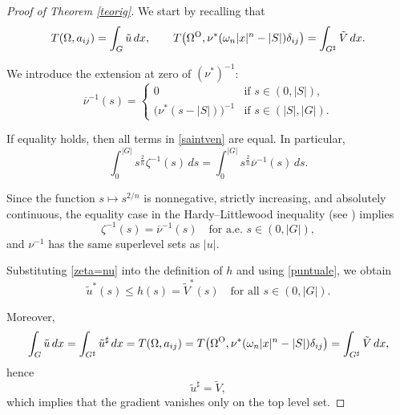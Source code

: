 \documentclass[oneside,a4paper,11pt,notitlepage]{article}
\theoremstyle{definition}
\theoremstyle{plain}
\theoremstyle{definition}
\newcommand{\OO}{\text{\normalfont  O}}
\begin{document}
\begin{proof}[Proof of Theorem \ref{teorig}]
We start by recalling that
\[
T(\Omega,a_{ij})=\int_G \tilde u\,dx,
\qquad 
T\!\left(\Omega^\OO,\nu^*(\omega_n|x|^n-|S|)\delta_{ij}\right)
=\int_{G^\sharp}\tilde V\,dx.
\]

We introduce the extension at zero of $(\nu^\ast)^{-1}$:
\[
\overline{\nu}^{-1}(s)=
\begin{cases}
0 & \text{if } s\in(0,|S|),\\[4pt]
\bigl(\nu^*(s-|S|)\bigr)^{-1} & \text{if } s\in(|S|,|G|).
\end{cases}
\]

If equality holds, then all terms in \eqref{saintven} are equal. In particular,
\begin{equation*}%
\int_0^{|G|} s^{\frac{2}{n}}\zeta^{-1}(s)\,ds
=
\int_0^{|G|} s^{\frac{2}{n}}\overline{\nu}^{-1}(s)\,ds.
\end{equation*}

Since the function $s \mapsto s^{2/n}$ is nonnegative, strictly increasing, and absolutely continuous, the equality case in the Hardy--Littlewood inequality (see \cite{BM}) implies
\begin{equation}\label{zeta=nu}
\zeta^{-1}(s)=\overline{\nu}^{-1}(s)
\quad \text{for a.e. } s\in(0,|G|),
\end{equation}
and $\nu^{-1}$ has the same superlevel sets as $|u|$.

Substituting \eqref{zeta=nu} into the definition of $h$ and using \eqref{puntuale}, we obtain
\[
\tilde u^*(s)\le h(s)=\tilde V^*(s)
\quad \text{for all } s\in(0,|G|).
\]

Moreover,
\[
\int_G \tilde u\,dx
=
\int_{G^\sharp} \tilde u^\sharp\,dx
=
T(\Omega,a_{ij})
=
T\!\left(\Omega^\OO,\nu^*(\omega_n|x|^n-|S|)\delta_{ij}\right)
=
\int_{G^\sharp}\tilde V\,dx,
\]
hence
\begin{equation}\label{uast=V}
\tilde u^\sharp=\tilde V,
\end{equation}
which implies that the gradient vanishes only on the top level set.

\medskip


\end{proof}
\end{document}
